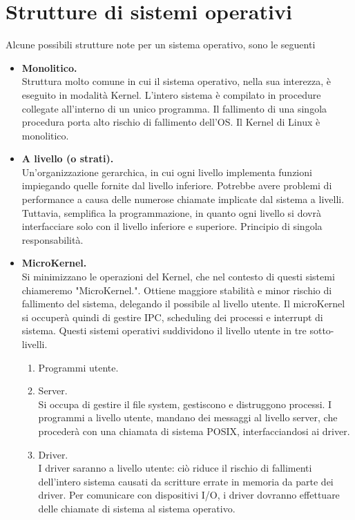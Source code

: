 \documentclass{report}
\begin{document}
\newpage

\section{Strutture di sistemi operativi}
Alcune possibili strutture note per un sistema operativo, sono le seguenti

\begin{itemize}
    \item \textbf{Monolitico.}\\
    Struttura molto comune in cui il sistema operativo, nella sua interezza, è eseguito in modalità Kernel. L'intero sistema è compilato in procedure collegate all'interno di un unico programma. Il fallimento di una singola procedura porta alto rischio di fallimento dell'OS. Il Kernel di Linux è monolitico.

    \item \textbf{A livello (o strati).}\\
    Un'organizzazione gerarchica, in cui ogni livello implementa funzioni impiegando quelle fornite dal livello inferiore.
    Potrebbe avere problemi di performance a causa delle numerose chiamate implicate dal sistema a livelli.\\
    Tuttavia, semplifica la programmazione, in quanto ogni livello si dovrà interfacciare solo con il livello inferiore e superiore. Principio di singola responsabilità.

    \item \textbf{MicroKernel.}\\
    Si minimizzano le operazioni del Kernel, che nel contesto di questi sistemi chiameremo "MicroKernel.". Ottiene maggiore stabilità e minor rischio di fallimento del sistema, delegando il possibile al livello utente. Il microKernel si occuperà quindi di gestire IPC, scheduling dei processi e interrupt di sistema. 
    Questi sistemi operativi suddividono il livello utente in tre sotto-livelli.
    \begin{enumerate}
        \item Programmi utente.
        \item Server.\\
        Si occupa di gestire il file system, gestiscono e distruggono processi. I programmi a livello utente, mandano dei messaggi al livello server, che procederà con una chiamata di sistema POSIX, interfacciandosi ai driver.
        
        \item Driver.\\
        I driver saranno a livello utente: ciò riduce il rischio di fallimenti dell'intero sistema causati da scritture errate in memoria da parte dei driver. Per comunicare con dispositivi I/O, i driver dovranno effettuare delle chiamate di sistema al sistema operativo.
    \end{enumerate}
    

\end{itemize}
\end{document}
